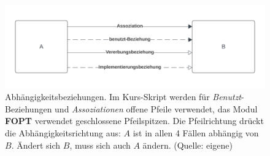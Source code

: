 \begin{figure}
    \centering
    \includegraphics[scale=0.4]{chapters/Anhang/CheatSheets/img/umldependencies}
    \caption{Abhängigkeitsbeziehungen. Im Kurs-Skript werden für \textit{Benutzt}-Beziehungen und \textit{Assoziationen} offene Pfeile verwendet, das Modul \textbf{FOPT} verwendet geschlossene Pfeilspitzen.
    Die Pfeilrichtung drückt die Abhängigkeitsrichtung aus: $A$ ist in allen 4 Fällen abhängig von $B$. Ändert sich $B$, muss sich auch $A$ ändern. (Quelle: eigene)}
    \label{fig:umldependencies}
\end{figure}
